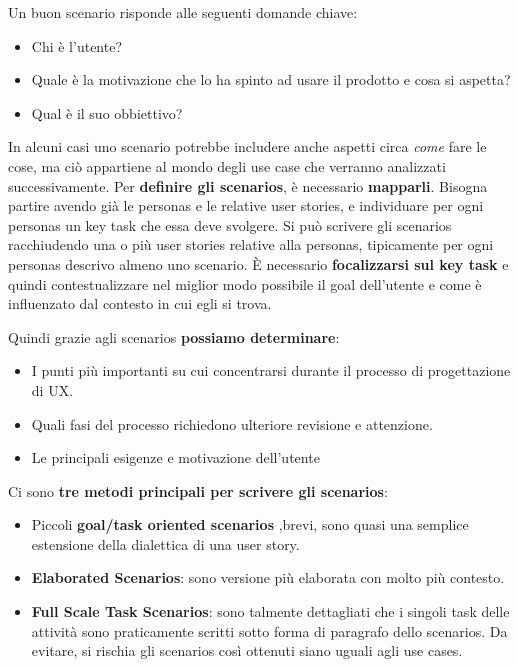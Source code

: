 \documentclass[a4paper,11pt,oneside]{book}
\begin{document}
Un buon scenario risponde alle seguenti domande chiave:

\begin{itemize}
	\item Chi è l'utente?
	\item Quale è la motivazione che lo ha spinto ad usare il prodotto e cosa si aspetta?
	\item Qual è il suo obbiettivo?
\end{itemize}

In alcuni casi uno scenario potrebbe includere anche aspetti circa \textit{come} fare le cose, ma ciò appartiene al mondo degli use case che verranno analizzati successivamente.
Per \textbf{definire gli scenarios}, è necessario \textbf{mapparli}. Bisogna partire avendo già le personas e le relative user stories, e individuare per ogni personas un key task che essa deve svolgere. Si può scrivere gli scenarios racchiudendo una o più
user stories relative alla personas, tipicamente per ogni personas descrivo almeno uno
scenario. È necessario \textbf{focalizzarsi sul key task} e quindi contestualizzare nel miglior modo possibile il goal dell'utente e come è influenzato dal contesto in cui egli si trova.

Quindi grazie agli scenarios \textbf{possiamo determinare}:

\begin{itemize}
	\item I punti più importanti su cui concentrarsi durante il processo di progettazione di UX.
	\item Quali fasi del processo richiedono ulteriore revisione e attenzione.
	\item Le principali esigenze e motivazione dell'utente
\end{itemize}

\pagebreak


Ci sono \textbf{tre metodi principali per scrivere gli scenarios}:

\begin{itemize}
	\item Piccoli \textbf{goal/task oriented scenarios} ,brevi, sono quasi una semplice estensione della dialettica di una user story.
	\item \textbf{Elaborated Scenarios}: sono versione più elaborata con molto più contesto.
	\item \textbf{Full Scale Task Scenarios}: sono talmente dettagliati che i singoli task delle attività sono praticamente scritti sotto forma di paragrafo dello scenarios. Da evitare, si rischia gli scenarios così ottenuti siano uguali agli use cases.
\end{itemize}
\end{document}
